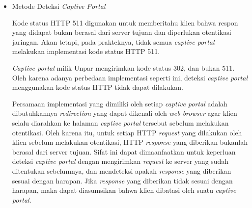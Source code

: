 \documentclass[a4paper,twoside]{article}
\begin{document}
\begin{enumerate}
\begin{itemize}
{                Kelas WebView pada \textit{Universal Windows Platform} (UWP) hanya dapat dihubungkan dengan kode C\# menggunakan javascript. \textit{Method} yang digunakan untuk melakukan eksekusi javascript pada WebView adalah InvokeScriptAsync. Metode ini memiliki parameter string berupa nama fungsi javascript yang ingin dipanggil dan array of string yang berisi argumen yang ingin dikirimkan ke dalam fungsi tersebut. Salah satu fungsi yang dapat dipanggil adalah \textit{eval}. Dengan menggunakan \textit{eval}, ekspresi javascript apapun dapat dijalankan pada WebView. Untuk mengirimkan data dari javascript ke kode C\#, dapat dijalankan fungsi window.external.notify dengan parameter berupa string. Oleh karena itu, diperlukan \textit{encoding} tertentu (seperti JSON\footnote{https://tools.ietf.org/html/rfc7159}) untuk memasukkan lebih dari satu argumen.

                InvokeScriptAsync dapat digunakan untuk memanggil fungsi \textit{eval} dengan parameter berupa function yang dapat digunakan untuk menekan tombol atau memasukkan nilai pada \textit{text field} tertentu. Selain itu, dapat dimasukkan event listener yang dapat memanggil window.external.notify menggunakan cara ini. Fungsi window.external.notify dapat membantu mengirimkan event-event seperti mouse click, keypress, atau perubahan nilai pada \textit{text field} yang ada pada halaman HTML pada WebView tersebut.
            }
            \item{
                Metode Deteksi \textit{Captive Portal}
                
                Kode status HTTP 511 digunakan untuk memberitahu klien bahwa respon yang didapat bukan berasal dari server tujuan dan diperlukan otentikasi jaringan. Akan tetapi, pada prakteknya, tidak semua \textit{captive portal} melakukan implementasi kode status HTTP 511.
                
                \textit{Captive portal} milik Unpar mengirimkan kode status 302, dan bukan 511. Oleh karena adanya perbedaan implementasi seperti ini, deteksi \textit{captive portal} menggunakan kode status HTTP tidak dapat dilakukan.
                
                Persamaan implementasi yang dimiliki oleh setiap \textit{captive portal} adalah dibutuhkannya \textit{redirection} yang dapat dikenali oleh \textit{web browser} agar klien selalu diarahkan ke halaman \textit{captive portal} tersebut sebelum melakukan otentikasi. Oleh karena itu, untuk setiap HTTP \textit{request} yang dilakukan oleh klien sebelum melakukan otentikasi, HTTP \textit{response} yang diberikan bukanlah berasal dari server tujuan. Sifat ini dapat dimaanfaatkan untuk keperluan deteksi \textit{captive portal} dengan mengirimkan \textit{request} ke server yang sudah ditentukan sebelumnya, dan mendeteksi apakah \textit{response} yang diberikan sesuai dengan harapan. Jika \textit{response} yang diberikan tidak sesuai dengan harapan, maka dapat diasumsikan bahwa klien dibatasi oleh suatu \textit{captive portal}.

}
\end{itemize}
\end{enumerate}
\end{document}
